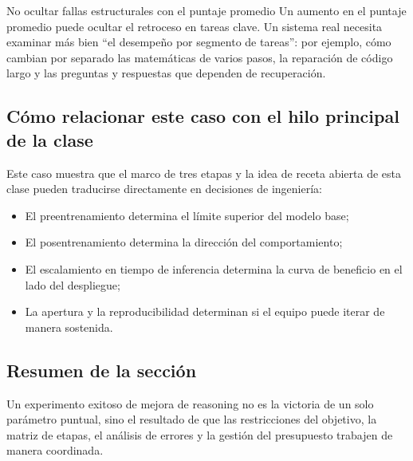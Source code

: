 \begin{warningbox}{No ocultar fallas estructurales con el puntaje promedio}
Un aumento en el puntaje promedio puede ocultar el retroceso en tareas clave. Un sistema real necesita examinar más bien ``el desempeño por segmento de tareas'': por ejemplo, cómo cambian por separado las matemáticas de varios pasos, la reparación de código largo y las preguntas y respuestas que dependen de recuperación.
\end{warningbox}

\subsection{Cómo relacionar este caso con el hilo principal de la clase}
Este caso muestra que el marco de tres etapas y la idea de receta abierta de esta clase pueden traducirse directamente en decisiones de ingeniería:
\begin{itemize}
    \item El preentrenamiento determina el límite superior del modelo base;
    \item El posentrenamiento determina la dirección del comportamiento;
    \item El escalamiento en tiempo de inferencia determina la curva de beneficio en el lado del despliegue;
    \item La apertura y la reproducibilidad determinan si el equipo puede iterar de manera sostenida.
\end{itemize}

\subsection{Resumen de la sección}
Un experimento exitoso de mejora de reasoning no es la victoria de un solo parámetro puntual, sino el resultado de que las restricciones del objetivo, la matriz de etapas, el análisis de errores y la gestión del presupuesto trabajen de manera coordinada.

